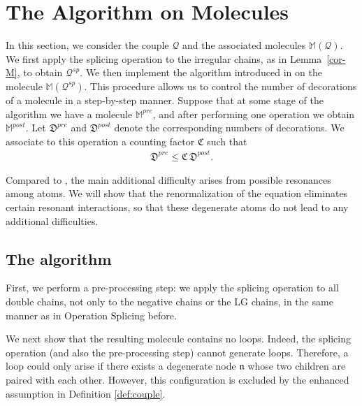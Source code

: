 \documentclass[UTF-8,reqno]{amsart}
\numberwithin{equation}{section}
\theoremstyle{definition}
\def\leq{\leqslant}
\def\leq{\leqslant}
\begin{document}
\section{The Algorithm on Molecules } \label{sec:Algorithm}
In this section, we consider the couple $\mathcal{Q}$ and the associated molecules $\mathbb{M}(\mathcal{Q})$. 
We first apply the splicing operation to the irregular chains, as in Lemma~\ref{cor-M}, 
to obtain $\mathcal{Q}^{sp}$. 
We then implement the algorithm introduced in \cite{Vas24} on the molecule $\mathbb{M}(\mathcal{Q}^{sp})$.
This procedure allows us to control the number of decorations of a molecule in a step-by-step manner. 
Suppose that at some stage of the algorithm we have a molecule $\mathbb{M}^{pre}$, 
and after performing one operation we obtain $\mathbb{M}^{post}$. 
Let $\mathfrak{D}^{pre}$ and $\mathfrak{D}^{post}$ denote the corresponding numbers of decorations. 
We associate to this operation a counting factor $\mathfrak{C}$ such that
\begin{align*}
    \mathfrak{D}^{pre} \leq \mathfrak{C}\,\mathfrak{D}^{post}.
\end{align*}

Compared to \cite{Vas24}, the main additional difficulty arises from possible resonances among atoms. 
We will show that the renormalization of the equation eliminates certain resonant interactions, 
so that these degenerate atoms do not lead to any additional difficulties. 
 

 


\subsection{The algorithm}\label{sec:algo:dege}
First, we perform a pre-processing step: we apply the splicing operation to all  double chains, 
not only to the negative chains or the LG chains, in the same manner as in Operation Splicing before.

We next show that the resulting molecule contains no loops. 
Indeed, the splicing operation (and also the pre-processing step) cannot generate loops. 
Therefore, a loop could only arise if there exists a degenerate node $\mathfrak{n}$ 
whose two children are paired with each other. 
However, this configuration is excluded by the enhanced assumption in Definition \ref{def:couple}. 
 
\end{document}
